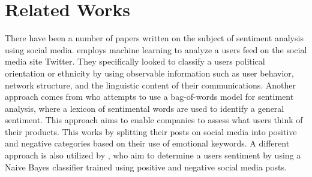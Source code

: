 \section{Related Works} There have been a number of papers written on
the subject of sentiment analysis using social media.
 employs machine learning to analyze a
users feed on the social media site Twitter. They specifically looked to classify a
users political orientation or ethnicity by using observable information such as
user behavior, network structure, and the linguistic content of their
communications. Another approach comes from  who
attempts to use a bag-of-words model for sentiment analysis, where a lexicon of
sentimental words are used to identify a general sentiment.
This approach aims to enable companies to assess what users think of their
products. This works by splitting their posts on social media into positive and
negative categories based on their use of emotional keywords. A different
approach is also utilized by , who aim to determine a
users sentiment by using a Naive Bayes classifier trained using positive and negative
social media posts.